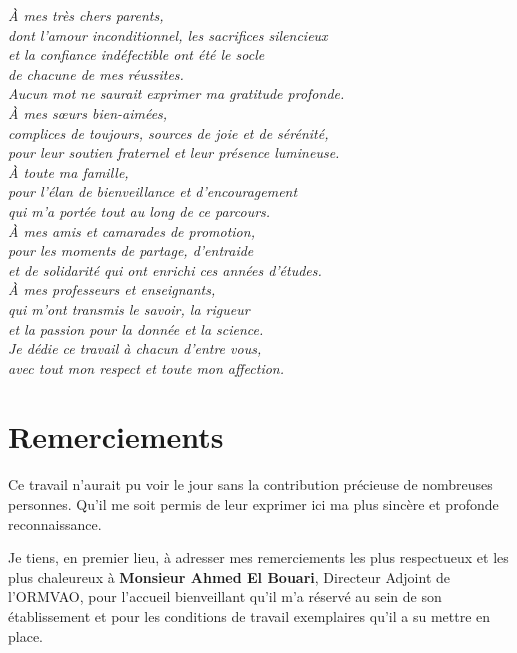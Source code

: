 \documentclass[12pt,a4paper]{report}
\begin{document}
\begin{center}
\itshape
À mes très chers parents,\\
dont l'amour inconditionnel, les sacrifices silencieux\\
et la confiance indéfectible ont été le socle\\
de chacune de mes réussites.\\
Aucun mot ne saurait exprimer ma gratitude profonde.\\[1em]

À mes sœurs bien-aimées,\\
complices de toujours, sources de joie et de sérénité,\\
pour leur soutien fraternel et leur présence lumineuse.\\[1em]

À toute ma famille,\\
pour l'élan de bienveillance et d'encouragement\\
qui m'a portée tout au long de ce parcours.\\[1em]

À mes amis et camarades de promotion,\\
pour les moments de partage, d'entraide\\
et de solidarité qui ont enrichi ces années d'études.\\[1em]

À mes professeurs et enseignants,\\
qui m'ont transmis le savoir, la rigueur\\
et la passion pour la donnée et la science.\\[1em]

Je dédie ce travail à chacun d'entre vous,\\
avec tout mon respect et toute mon affection.
\end{center}

\chapter*{Remerciements}

Ce travail n'aurait pu voir le jour sans la contribution précieuse de nombreuses personnes. Qu'il me soit permis de leur exprimer ici ma plus sincère et profonde reconnaissance.

Je tiens, en premier lieu, à adresser mes remerciements les plus respectueux et les plus chaleureux à \textbf{Monsieur Ahmed El Bouari}, Directeur Adjoint de l'ORMVAO, pour l'accueil bienveillant qu'il m'a réservé au sein de son établissement et pour les conditions de travail exemplaires qu'il a su mettre en place.
\end{document}
